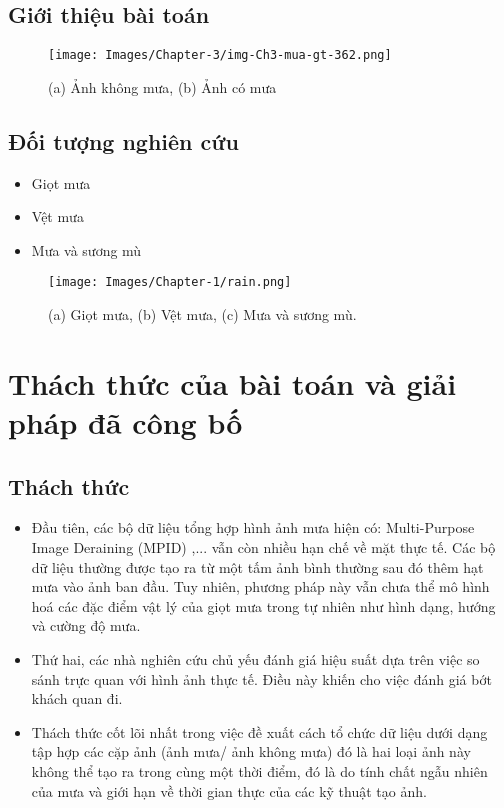 \subsection{Giới thiệu bài toán} 

\begin{figure}[ht!]
    \texttt{[image: Images/Chapter-3/img-Ch3-mua-gt-362.png]}
    \caption{(a) Ảnh không mưa,  (b) Ảnh có mưa}
    \label{fig:gioi-thieu-bai-toan}
\end{figure}
\subsection{Đối tượng nghiên cứu}
\begin{itemize}
    \item Giọt mưa
    \item Vệt mưa
    \item Mưa và sương mù
\end{itemize}
\begin{figure}[h]
    \centering
    \texttt{[image: Images/Chapter-1/rain.png]}
    \caption{(a) Giọt mưa, (b) Vệt mưa, (c) Mưa và sương mù.}
    \label{fig:rain}
\end{figure}
\section{Thách thức của bài toán và giải pháp đã công bố}
\subsection{Thách thức}
\begin{itemize}
    \item Đầu tiên, các bộ dữ liệu tổng hợp hình ảnh mưa hiện có:  Multi-Purpose Image Deraining (MPID) \cite{Li2019DerainBenchmark},... vẫn còn nhiều hạn chế về mặt thực tế. Các bộ dữ liệu thường được tạo ra từ một tấm ảnh bình thường sau đó thêm hạt mưa vào ảnh ban đầu. Tuy nhiên, phương pháp này vẫn chưa thể mô hình hoá các đặc điểm vật lý của giọt mưa trong tự nhiên như hình dạng, hướng và cường độ mưa.
    \item Thứ hai, các nhà nghiên cứu chủ yếu đánh giá hiệu suất dựa trên việc so sánh trực quan với hình ảnh thực tế. Điều này khiến cho việc đánh giá bớt khách quan đi.
    \item Thách thức cốt lõi nhất trong việc đề xuất cách tổ chức dữ liệu dưới dạng tập hợp các cặp ảnh (ảnh mưa/ ảnh không mưa) đó là hai loại ảnh này không thể tạo ra trong cùng một thời điểm, đó là do tính chất ngẫu nhiên của mưa và giới hạn về thời gian thực của các kỹ thuật tạo ảnh.
\end{itemize}
